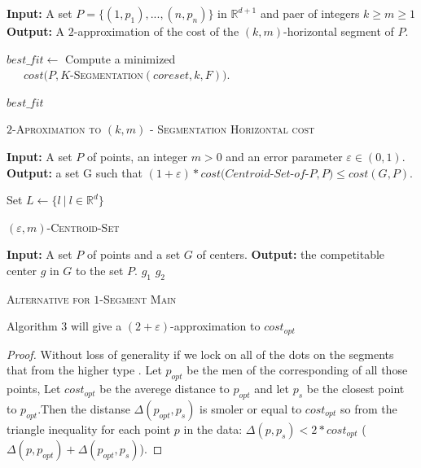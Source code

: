 \documentclass{vldb}
\begin{document}
\begin{algorithm}
\begin{algorithmic}
\STATE \textbf{Input:} A set $P = \lbrace(1,p_1),...,(n,p_n)\rbrace$ in $ \mathbb{R}^{d+1}$
and paer of integers $k\geq m\geq1$
\STATE \textbf{Output:} A $2$-approximation of the cost of the $(k,m)$-horizontal segment of $P$.
 
\STATE $best\_fit \gets $ Compute a minimized\\ \ \ \  $cost(P,$\textsc{$K$-Segmentation$(coreset,k,F)$}$)$.

\ENDFOR

\RETURN $best\_fit$



\caption{\textsc{$2$-Aproximation to $(k,m)$ - Segmentation Horizontal cost}}



\end{algorithmic}
\end{algorithm}
\begin{algorithm}
\begin{algorithmic}
\STATE \textbf{Input:} A set $P$ of points, an integer $m>0$ and an error parameter $\varepsilon\in (0,1)$. 
\STATE \textbf{Output:} a set G such that $(1+\varepsilon)*cost(Centroid$-$Set$-$of$-$P,P) \leq cost(G,P)$.

Set $L\gets \lbrace l\ \vert\ l \in \mathbb{R}^{d}     \rbrace$

\caption{\textsc{$(\varepsilon,m)$-Centroid-Set}}

\end{algorithmic}
\end{algorithm}


\begin{algorithm}
\begin{algorithmic}
\STATE \textbf{Input:} A set $P$ of points and a set $G$ of centers. 
\STATE \textbf{Output:} the competitable center $g$ in $G$ to the set $P$.
\RETURN $g_1$
\ELSE
\RETURN $g_2$
\ENDIF 

\caption{\textsc{Alternative for $1$-Segment Main}}

\end{algorithmic}
\end{algorithm}
\newtheorem{A}{Theorem}
\begin{theorem}
Algorithm 3 will give a 
$(2+\varepsilon)$-approximation to $cost_{opt}$


\end{theorem}
\begin{proof}
Without loss of generality
if we lock on all of the dots on the segments that from the higher type .
Let $p_{opt}$ be the men of the corresponding of all those points, Let $cost_{opt}$ be the averege distance to $p_{opt}$ and let $p_{s}$ be the closest point to $p_{opt}$.Then the distanse $\Delta(p_{opt},p_s)$ is smoler or equal to $cost_{opt}$ so from the triangle inequality for each point $p$ in the data: $\Delta(p,p_s)<2*cost_{opt}$ ($\Delta(p,p_{opt})+\Delta(p_{opt},p_s)$).

\end{proof}
\end{document}
